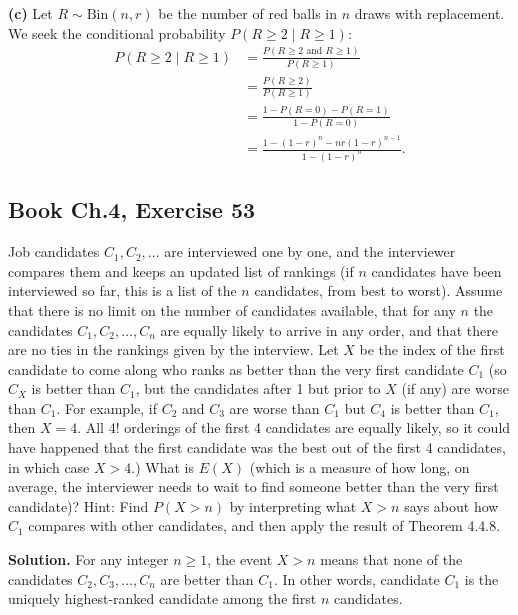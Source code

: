 \documentclass[11pt,a4paper]{article}
\begin{document}
\vspace{4pt}
\noindent \textbf{(c)} Let $R \sim \text{Bin}(n, r)$ be the number of red balls in $n$ draws with replacement. We seek the conditional probability $P(R \ge 2 \mid R \ge 1)$:
\begin{align*}
P(R \ge 2 \mid R \ge 1) &= \frac{P(R \ge 2 \text{ and } R \ge 1)}{P(R \ge 1)} \\
&= \frac{P(R \ge 2)}{P(R \ge 1)} \\
&= \frac{1 - P(R = 0) - P(R = 1)}{1 - P(R = 0)} \\
&= \frac{1 - (1 - r)^n - n r (1 - r)^{n-1}}{1 - (1 - r)^n}.
\end{align*}

\vspace{10pt}
\subsection{Book Ch.4, Exercise 53}
\begin{tcolorbox}[title={Book Ch.4, Exercise 53}]
Job candidates $C_1, C_2, \dots$ are interviewed one by one, and the interviewer compares them and keeps an updated list of rankings (if $n$ candidates have been interviewed so far, this is a list of the $n$ candidates, from best to worst). Assume that there is no limit on the number of candidates available, that for any $n$ the candidates $C_1, C_2, \dots, C_n$ are equally likely to arrive in any order, and that there are no ties in the rankings given by the interview.
Let $X$ be the index of the first candidate to come along who ranks as better than the very first candidate $C_1$ (so $C_X$ is better than $C_1$, but the candidates after 1 but prior to $X$ (if any) are worse than $C_1$. For example, if $C_2$ and $C_3$ are worse than $C_1$ but $C_4$ is better than $C_1$, then $X = 4$. All 4! orderings of the first 4 candidates are equally likely, so it could have happened that the first candidate was the best out of the first 4 candidates, in which case $X > 4$.)
What is $E(X)$ (which is a measure of how long, on average, the interviewer needs to wait to find someone better than the very first candidate)?
Hint: Find $P(X > n)$ by interpreting what $X > n$ says about how $C_1$ compares with other candidates, and then apply the result of Theorem 4.4.8.
\end{tcolorbox}

\noindent \textbf{Solution.} For any integer $n \ge 1$, the event $X > n$ means that none of the candidates $C_2, C_3, \dots, C_n$ are better than $C_1$. In other words, candidate $C_1$ is the uniquely highest-ranked candidate among the first $n$ candidates.
\end{document}
